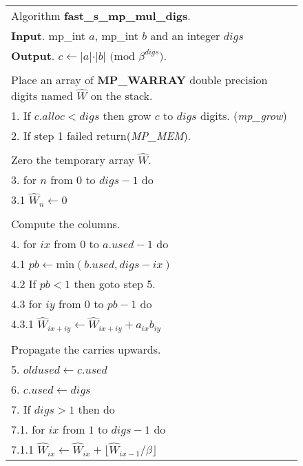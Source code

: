 \documentclass[b5paper]{book}
\begin{document}
\newpage\begin{figure}[!here]
\begin{small}
\begin{center}
\begin{tabular}{l}
\hline Algorithm \textbf{fast\_s\_mp\_mul\_digs}. \\
\textbf{Input}.   mp\_int $a$, mp\_int $b$ and an integer $digs$ \\
\textbf{Output}.  $c \leftarrow \vert a \vert \cdot \vert b \vert \mbox{ (mod }\beta^{digs}\mbox{)}$. \\
\hline \\
Place an array of \textbf{MP\_WARRAY} double precision digits named $\hat W$ on the stack. \\
1.  If $c.alloc < digs$ then grow $c$ to $digs$ digits. (\textit{mp\_grow}) \\
2.  If step 1 failed return(\textit{MP\_MEM}).\\
\\
Zero the temporary array $\hat W$. \\
3.  for $n$ from $0$ to $digs - 1$ do \\
\hspace{3mm}3.1  $\hat W_n \leftarrow 0$ \\
\\
Compute the columns. \\
4.  for $ix$ from $0$ to $a.used - 1$ do \\
\hspace{3mm}4.1  $pb \leftarrow \mbox{min}(b.used, digs - ix)$ \\
\hspace{3mm}4.2  If $pb < 1$ then goto step 5. \\
\hspace{3mm}4.3  for $iy$ from $0$ to $pb - 1$ do \\
\hspace{6mm}4.3.1  $\hat W_{ix+iy} \leftarrow \hat W_{ix+iy} + a_{ix}b_{iy}$ \\
\\
Propagate the carries upwards. \\
5.  $oldused \leftarrow c.used$ \\
6.  $c.used \leftarrow digs$ \\
7.  If $digs > 1$ then do \\
\hspace{3mm}7.1.  for $ix$ from $1$ to $digs - 1$ do \\
\hspace{6mm}7.1.1  $\hat W_{ix} \leftarrow \hat W_{ix} + \lfloor \hat W_{ix-1} / \beta \rfloor$ \\

\end{tabular}
\end{center}
\end{small}
\end{figure}
\end{document}
